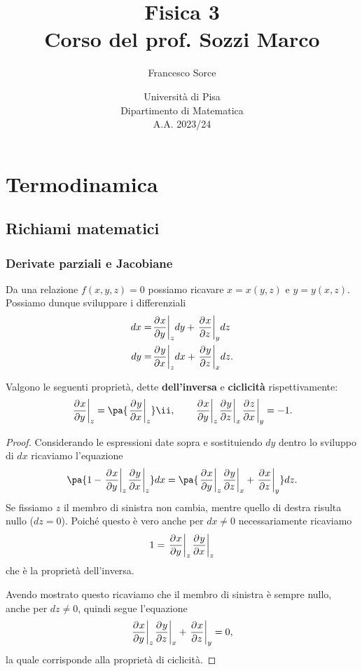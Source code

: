 \documentclass[a4paper]{report}
\title{Fisica 3\\
\large Corso del prof. Sozzi Marco}
\author{Francesco Sorce}
\date{Università di Pisa\\
Dipartimento di Matematica\\
A.A. 2023/24}
\begin{document}
\maketitle

\tableofcontents
\newpage


\part{Termodinamica}










\appendix
\chapter{Richiami matematici}
\section{Derivate parziali e Jacobiane}
Da una relazione $f(x,y,z)=0$ possiamo ricavare $x=x(y,z)$ e $y=y(x,z)$.\\
Possiamo dunque sviluppare i differenziali
\begin{align*}
dx=&\ppb yxzdy+\ppb zxydz\\
dy=&\ppb xyzdx+\ppb zyxdz.
\end{align*}

\begin{proposition}\label{ProprietaDerivateParziali}
Valgono le seguenti propriet\`a, dette \textbf{dell'inversa} e \textbf{ciclicit\`a} rispettivamente:
\[\ppb yxz=\pa{\ppb xyz}\ii,\qquad \ppb yxz\ppb zyx\ppb xzy=-1.\]
\end{proposition}
\begin{proof}
Considerando le espressioni date sopra e sostituiendo $dy$ dentro lo sviluppo di $dx$ ricaviamo l'equazione
\[\pa{1-\ppb yxz\ppb xyz}dx=\pa{\ppb yxz\ppb zyx+\ppb zxy}dz.\]
Se fissiamo $z$ il membro di sinistra non cambia, mentre quello di destra risulta nullo ($dz=0$). Poich\'e questo \`e vero anche per $dx\neq 0$ necessariamente ricaviamo
\[1=\ppb yxz\ppb xyz\]
che \`e la propriet\`a dell'inversa.\medskip

\noindent Avendo mostrato questo ricaviamo che il membro di sinistra \`e sempre nullo, anche per $dz\neq 0$, quindi segue l'equazione
\[\ppb yxz\ppb zyx+\ppb zxy=0,\]
la quale corrisponde alla propriet\`a di ciclicit\`a.
\end{proof}
\end{document}

